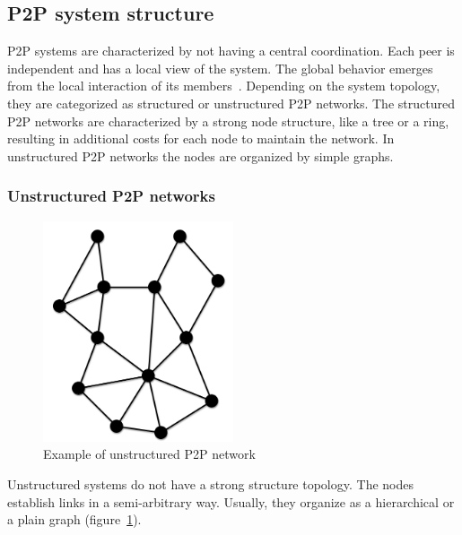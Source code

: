 \subsection{P2P system structure}
\label{sec:p2p_estructure}

P2P systems are characterized by not having a central coordination. Each
peer is independent and has a local view of the system. The global behavior
emerges from the local interaction of its members~\cite{Aberer:2001:PIS:503271.503268}.
Depending on the system topology, they are categorized as structured or
unstructured P2P networks. The structured P2P networks are characterized by a
strong node structure, like a tree or a ring, resulting in additional costs for
each node to maintain the network. In unstructured P2P networks the nodes are organized
by simple graphs.

\subsubsection{Unstructured P2P networks}
\label{sec:p2p_unstructured}

\begin{figure}
\center
\includegraphics[width=0.5\textwidth]{img/p2p-unstructured}
\caption{Example of unstructured P2P network}
\label{fig:p2p_unstructured}
\end{figure}

Unstructured systems do not have a strong structure topology. The nodes
establish links in a semi-arbitrary way. Usually, they organize as a hierarchical or a
plain graph (figure~\ref{fig:p2p_unstructured}).

